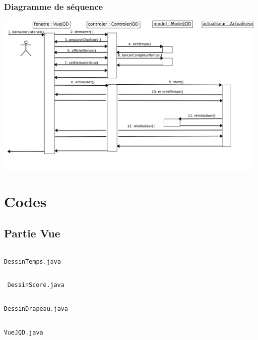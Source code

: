 \documentclass{article}
\begin{document}
\subsubsection{Diagramme de séquence}
\begin{center}
\includegraphics[scale=0.17]{diagMess.png}
\end{center}

\newpage
\section{Codes}
\subsection{Partie Vue}
\inputminted[frame=single]{java}{../encapsulation/DessinTemps.java}
\begin{center} \texttt{DessinTemps.java} \end{center}
\inputminted[frame=single]{java}{../encapsulation/DessinScore.java}
\begin{center} \texttt{DessinScore.java} \end{center}
\inputminted[frame=single]{java}{../encapsulation/DessinDrapeau.java}
\begin{center} \texttt{DessinDrapeau.java} \end{center}
\inputminted[frame=single]{java}{../encapsulation/VueJQD.java}
\begin{center} \texttt{VueJQD.java} \end{center}
\end{document}
